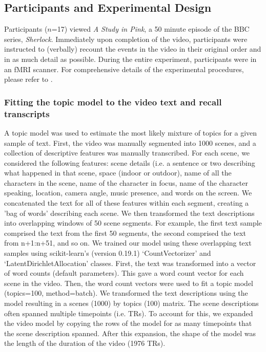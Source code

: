 \documentclass{article}
\begin{document}
{\subsection{Participants and Experimental Design}
Participants ($n$=17) viewed \textit{A Study in Pink}, a 50 minute episode of the BBC series, \textit{Sherlock}. Immediately upon completion of the video, participants were instructed to (verbally) recount the events in the video in their original order and in as much detail as possible. During the entire experiment, participants were in an fMRI scanner. For comprehensive details of the experimental procedures, please refer to \cite{ChenEtal17}.

\subsubsection{Fitting the topic model to the video text and recall transcripts}
A topic model was used to estimate the most likely mixture of topics for a given sample of text. First, the video was manually segmented into 1000 scenes, and a collection of descriptive features was manually transcribed. For each scene, we considered the following features: scene details (i.e. a sentence or two describing what happened in that scene, space (indoor or outdoor), name of all the characters in the scene, name of the character in focus, name of the character speaking, location, camera angle, music presence, and words on the screen. We concatenated the text for all of these features within each segment, creating a 'bag of words' describing each scene. We then transformed the text descriptions into overlapping windows of 50 scene segments. For example, the first text sample comprised the text from the first 50 segments, the second comprised the text from n+1:n+51, and so on. We trained our model using these overlapping text samples using scikit-learn's (version 0.19.1) `CountVectorizer' and `LatentDirichletAllocation' classes.  First, the text was transformed into a vector of word counts (default parameters). This gave a word count vector for each scene in the video.  Then, the word count vectors were used to fit a topic model (topics=100, method=batch). We transformed the text descriptions using the model resulting in a scenes (1000) by topics (100) matrix. The scene descriptions often spanned multiple timepoints (i.e. TRs). To account for this, we expanded the video model by copying the rows of the model for as many timepoints that the scene description spanned. After this expansion, the shape of the model was the length of the duration of the video (1976 TRs).

}
\end{document}
